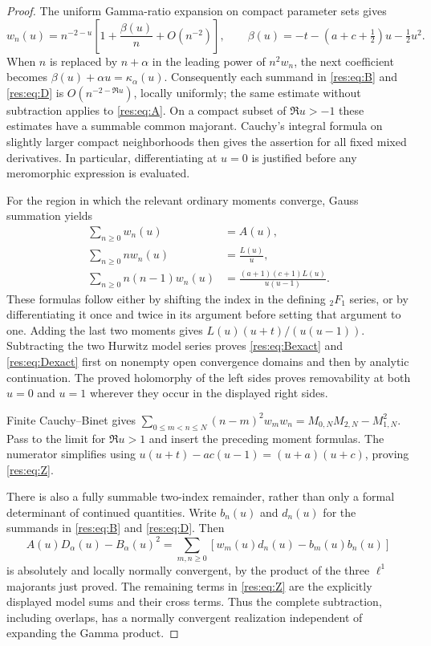\begin{proof}
The uniform Gamma-ratio expansion on compact parameter sets
\cite[Section 5.11(iii)]{DLMF} gives
\[
 w_n(u)=n^{-2-u}\left[1+\frac{\beta(u)}n+O(n^{-2})\right],\qquad
 \beta(u)=-t-(a+c+\tfrac12)u-\tfrac12u^2.
\]
When $n$ is replaced by $n+\alpha$ in the leading power of $n^2w_n$,
the next coefficient becomes $\beta(u)+\alpha u=\kappa_\alpha(u)$.
Consequently each summand in \eqref{res:eq:B} and \eqref{res:eq:D}
is $O(n^{-2-\Re u})$, locally uniformly; the same estimate without
subtraction applies to \eqref{res:eq:A}.  On a compact subset of
$\Re u>-1$ these estimates have a summable common majorant.
Cauchy's integral formula on slightly larger compact neighborhoods
then gives the assertion for all fixed mixed derivatives.  In
particular, differentiating at $u=0$ is justified before any
meromorphic expression is evaluated.

For the region in which the relevant ordinary moments converge,
Gauss summation \cite[Equation 15.4.20]{DLMF} yields
\begin{align*}
 \sum_{n\geq0}w_n(u)&=A(u),\\
 \sum_{n\geq0}nw_n(u)&=\frac{L(u)}u,\\
 \sum_{n\geq0}n(n-1)w_n(u)
    &=\frac{(a+1)(c+1)L(u)}{u(u-1)}.
\end{align*}
These formulas follow either by shifting the index in the defining
${}_2F_1$ series, or by differentiating it once and twice in its
argument before setting that argument to one.  Adding the last two
moments gives $L(u)(u+t)/(u(u-1))$.  Subtracting the two Hurwitz model
series proves \eqref{res:eq:Bexact} and \eqref{res:eq:Dexact} first on
nonempty open convergence domains and then by analytic continuation.
The proved holomorphy of the left sides proves removability at both
$u=0$ and $u=1$ wherever they occur in the displayed right sides.

Finite Cauchy--Binet gives
$\sum_{0\leq m<n\leq N}(n-m)^2w_mw_n=M_{0,N}M_{2,N}-M_{1,N}^2$.
Pass to the limit for $\Re u>1$ and insert the preceding moment
formulas.  The numerator simplifies using
$u(u+t)-ac(u-1)=(u+a)(u+c)$, proving \eqref{res:eq:Z}.

There is also a fully summable two-index remainder, rather than only
a formal determinant of continued quantities.  Write $b_n(u)$ and
$d_n(u)$ for the summands in \eqref{res:eq:B} and \eqref{res:eq:D}.
Then
\[
 A(u)D_\alpha(u)-B_\alpha(u)^2
 =\sum_{m,n\geq0}\left[w_m(u)d_n(u)-b_m(u)b_n(u)\right]
\]
is absolutely and locally normally convergent, by the product of
the three $\ell^1$ majorants just proved.  The remaining terms in
\eqref{res:eq:Z} are the explicitly displayed model sums and their
cross terms.  Thus the complete subtraction, including overlaps,
has a normally convergent realization independent of expanding
the Gamma product.
\end{proof}

